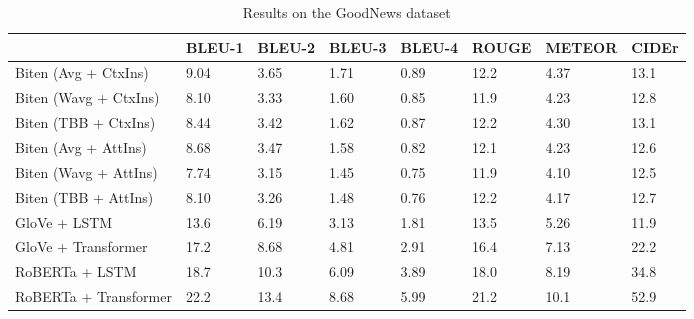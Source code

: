 \documentclass[10pt,twocolumn,letterpaper]{article}
\begin{document}
\begin{table}[t]
	\caption {Results on the GoodNews dataset}
	\label{tab:results-goodnews}
	\centering
	\begin{tabular}{llllllll}
		\toprule
		 & BLEU-1  & BLEU-2 & BLEU-3 & BLEU-4 & ROUGE & METEOR & CIDEr\\
      \midrule
      Biten (Avg + CtxIns) \cite{Biten2019GoodNews} & 9.04 & 3.65 & 1.71 & 0.89 & 12.2 & 4.37 & 13.1 \\
      Biten (Wavg + CtxIns) \cite{Biten2019GoodNews} & 8.10 & 3.33 & 1.60 & 0.85 & 11.9 & 4.23 & 12.8 \\
      Biten (TBB + CtxIns) \cite{Biten2019GoodNews} & 8.44 & 3.42 & 1.62 & 0.87 & 12.2 & 4.30 & 13.1 \\
      Biten (Avg + AttIns) \cite{Biten2019GoodNews} & 8.68 & 3.47 & 1.58 & 0.82 & 12.1 & 4.23 & 12.6 \\
      Biten (Wavg + AttIns) \cite{Biten2019GoodNews} & 7.74 & 3.15 & 1.45 & 0.75 & 11.9 & 4.10 & 12.5 \\
      Biten (TBB + AttIns) \cite{Biten2019GoodNews} & 8.10 & 3.26 & 1.48 & 0.76 & 12.2 & 4.17 & 12.7 \\
      \midrule
      GloVe + LSTM & 13.6 & 6.19 & 3.13 & 1.81 & 13.5 & 5.26 & 11.9 \\
      GloVe + Transformer & 17.2 & 8.68 & 4.81 & 2.91 & 16.4 & 7.13 & 22.2 \\
      RoBERTa + LSTM & 18.7  & 10.3 & 6.09 & 3.89  & 18.0  & 8.19 & 34.8  \\
      RoBERTa + Transformer & 22.2 & 13.4 & 8.68 & 5.99 & 21.2 & 10.1 & 52.9 \\ %
		\bottomrule
	\end{tabular}
\end{table}
\end{document}
